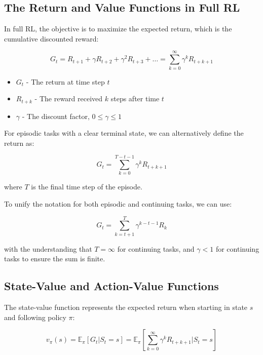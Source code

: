 \documentclass[12pt,a4paper]{article}
\begin{document}
\subsection{The Return and Value Functions in Full RL}

In full RL, the objective is to maximize the expected return, which is the cumulative discounted reward:

\begin{equation}
G_t = R_{t+1} + \gamma R_{t+2} + \gamma^2 R_{t+3} + \ldots = \sum_{k=0}^{\infty} \gamma^k R_{t+k+1}
\end{equation}

\begin{tcolorbox}[title=Notation Overview]
\begin{itemize}
    \item $G_t$ - The return at time step $t$
    \item $R_{t+k}$ - The reward received $k$ steps after time $t$
    \item $\gamma$ - The discount factor, $0 \leq \gamma \leq 1$
\end{itemize}
\end{tcolorbox}

For episodic tasks with a clear terminal state, we can alternatively define the return as:

\begin{equation}
G_t = \sum_{k=0}^{T-t-1} \gamma^k R_{t+k+1}
\end{equation}

where $T$ is the final time step of the episode.

To unify the notation for both episodic and continuing tasks, we can use:

\begin{equation}
G_t = \sum_{k=t+1}^{T} \gamma^{k-t-1} R_k
\end{equation}

with the understanding that $T=\infty$ for continuing tasks, and $\gamma < 1$ for continuing tasks to ensure the sum is finite.

\subsection{State-Value and Action-Value Functions}

The state-value function represents the expected return when starting in state $s$ and following policy $\pi$:

\begin{equation}
v_{\pi}(s) = \mathbb{E}_{\pi}[G_t|S_t = s] = \mathbb{E}_{\pi}\left[\sum_{k=0}^{\infty} \gamma^k R_{t+k+1} \bigg| S_t = s\right]
\end{equation}
\end{document}
